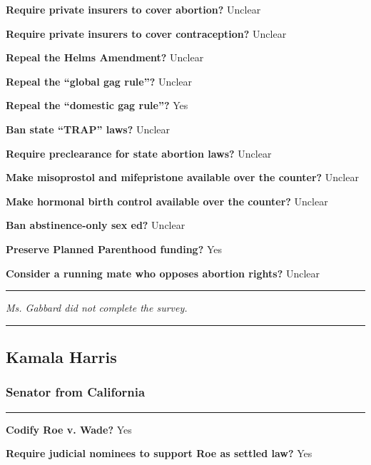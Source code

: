 \textbf{Require private insurers to cover abortion?} Unclear

\textbf{Require private insurers to cover contraception?} Unclear

\textbf{Repeal the Helms Amendment?} Unclear

\textbf{Repeal the ``global gag rule''?} Unclear

\textbf{Repeal the ``domestic gag rule''?} Yes

\textbf{Ban state ``TRAP'' laws?} Unclear

\textbf{Require preclearance for state abortion laws?} Unclear

\textbf{Make misoprostol and mifepristone available over the counter?}
Unclear

\textbf{Make hormonal birth control available over the counter?} Unclear

\textbf{Ban abstinence-only sex ed?} Unclear

\textbf{Preserve Planned Parenthood funding?} Yes

\textbf{Consider a running mate who opposes abortion rights?} Unclear

\begin{center}\rule{0.5\linewidth}{\linethickness}\end{center}

\emph{Ms. Gabbard did not complete the survey.}

\begin{center}\rule{0.5\linewidth}{\linethickness}\end{center}

\hypertarget{kamala-harris}{%
\subsection{Kamala Harris}\label{kamala-harris}}

\hypertarget{senator-from-california}{%
\subsubsection{Senator from California}\label{senator-from-california}}

\begin{center}\rule{0.5\linewidth}{\linethickness}\end{center}

\textbf{Codify Roe v. Wade?} Yes

\textbf{Require judicial nominees to support Roe as settled law?} Yes

